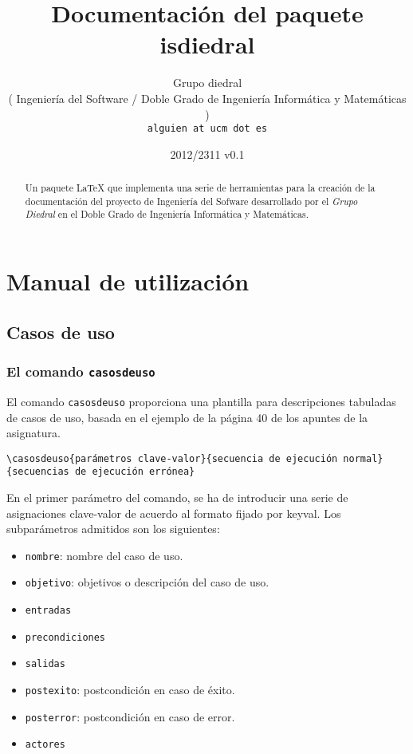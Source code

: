 \documentclass[draft]{ltxdoc}
\begin{document}
\title{Documentación del paquete \textsf{isdiedral}}
\author{Grupo diedral\\(\small{ }Ingeniería del Software / Doble Grado de Ingeniería Informática y Matemáticas )\\
\texttt{\color{gray}alguien at ucm dot es}}
\date{2012/2311 \qquad v0.1}


\maketitle

\begin{abstract}
	Un paquete \LaTeX{} que implementa una serie de herramientas para la creación de la documentación del proyecto de Ingeniería del Sofware desarrollado por el \textit{Grupo Diedral} en el Doble Grado de Ingeniería Informática y Matemáticas.
\end{abstract}

\tableofcontents

\section{Manual de utilización}
\subsection{Casos de uso}
\subsubsection{El comando \texttt{casosdeuso}} \label{comandocasos}
	El comando \verb|casosdeuso| proporciona una plantilla para descripciones tabuladas de casos de uso, basada en el ejemplo de la página 40 de los apuntes de la asignatura.

	\begin{Verbatim}[frame=single]
\casosdeuso{parámetros clave-valor}{secuencia de ejecución normal} 
{secuencias de ejecución errónea}
	\end{Verbatim}

	En el primer parámetro del comando, se ha de introducir una serie de asignaciones clave-valor de acuerdo al formato
fijado por \textsf{keyval}. Los subparámetros admitidos son los siguientes:
	\begin{multicols}{2}
		\begin{itemize}
			\item \verb|nombre|: nombre del caso de uso.
			\item \verb|objetivo|: objetivos o descripción del caso de uso.
			\item \verb|entradas|
			\item \verb|precondiciones|
			\item \verb|salidas|
			\item \verb|postexito|: postcondición en caso de éxito.
			\item \verb|posterror|: postcondición en caso de error.
			\item \verb|actores|
		\end{itemize}
	\end{multicols}
\end{document}
